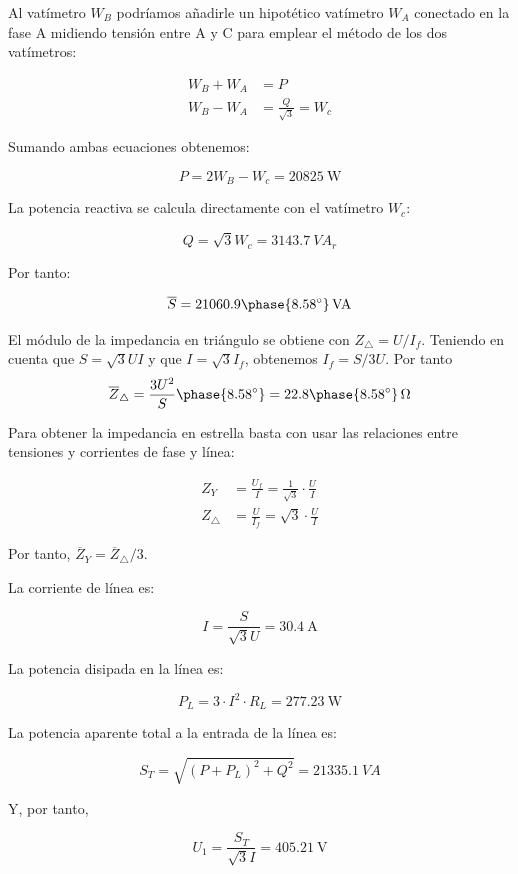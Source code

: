 \documentclass[12pt]{article}
\begin{document}
Al vatímetro $W_B$ podríamos añadirle un hipotético vatímetro
$W_A$ conectado en la fase A midiendo tensión entre A y C para
emplear el método de los dos vatímetros:


\begin{align*}
W_B + W_A &= P\\
W_B - W_A &= \frac{Q}{\sqrt{3}} = W_c
\end{align*}

Sumando ambas ecuaciones obtenemos:

\[
  P = 2 W_B - W_c = \SI{20825}{\watt}
\]

La potencia reactiva se calcula directamente con el vatímetro $W_c$:

\[
  Q = \sqrt{3} W_c = \SI{3143.7}{VA}_r
\]

Por tanto:

\[
  \overline{S} =
  \SI[parse-numbers=false]{21060.9\phase{\ang{8.58}}}{VA}
\]

El módulo de la impedancia en triángulo se obtiene con
$Z_{\triangle} = U / I_f$. Teniendo en cuenta que $S = \sqrt{3} U I$
y que $I = \sqrt{3} I_f$, obtenemos $I_f = S / 3U$. Por tanto
\[
  \overline{Z}_{\triangle} = \frac{3 U^2}{S}\phase{\ang{8.58}} =
  \SI[parse-numbers=false]{22.8\phase{\ang{8.58}}}{\ohm}
\]


Para obtener la impedancia en estrella basta con usar las relaciones
entre tensiones y corrientes de fase y línea:

\begin{align*}
  Z_Y &= \frac{U_f}{I} = \frac{1}{\sqrt{3}} \cdot \frac{U}{I}\\
  Z_\triangle &= \frac{U}{I_f} = \sqrt{3} \cdot \frac{U}{I}
\end{align*}

Por tanto, $\overline{Z}_{Y} = \overline{Z}_{\triangle} / 3$.

La corriente de línea es:

\[
  I = \frac{S}{\sqrt{3} U} = \SI{30.4}{\ampere}
\]

La potencia disipada en la línea es:

\[
  P_L = 3 \cdot I^2 \cdot R_L = \SI{277.23}{\watt}
\]

La potencia aparente total a la entrada de la línea es:

\[
  S_T = \sqrt{(P + P_L)^2 + Q^2} = \SI{21335.1}{VA}
\]

Y, por tanto,

\[
  U_1 = \frac{S_T}{\sqrt{3} I} = \SI{405.21}{\volt}
\]
\end{document}
